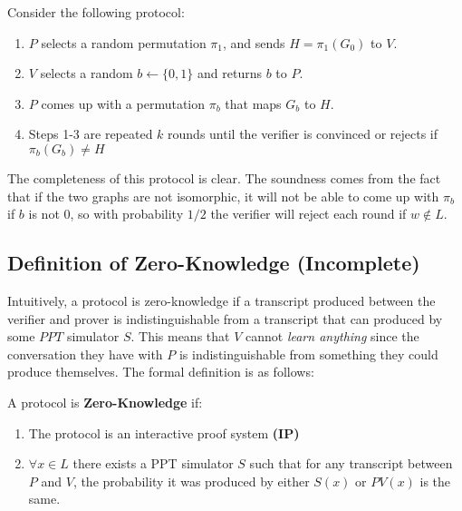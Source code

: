 \documentclass[11pt]{article}
\begin{document}
Consider the following protocol:
\begin{enumerate}
    \item $P$ selects a random permutation $\pi_1$, and sends $H = \pi_1(G_0)$ to $V$.
    \item $V$ selects a random $b \leftarrow \{0,1\}$ and returns $b$ to $P$.
    \item $P$ comes up with a permutation $\pi_b$ that maps $G_b$ to $H$.
    \item Steps 1-3 are repeated $k$ rounds until the verifier is convinced or rejects if $\pi_b(G_b) \neq H$
\end{enumerate}

The completeness of this protocol is clear. The soundness comes from the fact that if the two graphs are not isomorphic, it will not be able to come up with $\pi_b$ if $b$ is not $0$, so with probability $1/2$ the verifier will reject each round if $w \notin L$.

\subsection{Definition of Zero-Knowledge (Incomplete)}
Intuitively, a protocol is zero-knowledge if a transcript produced between the verifier and prover is indistinguishable from a transcript that can produced by some $PPT$ simulator $S$. This means that $V$ cannot \textit{learn anything} since the conversation they have with $P$ is indistinguishable from something they could produce themselves. The formal definition is as follows:
\vspace{1em}

A protocol is \textbf{Zero-Knowledge} if:
\begin{enumerate}
\item The protocol is an interactive proof system \textbf{(IP)}
\item $\forall x \in L$ there exists a PPT simulator $S$ such that for any transcript between $P$ and $V$, the probability it was produced by either $S(x)$ or $PV(x)$ is the same.
\end{enumerate}
\end{document}
